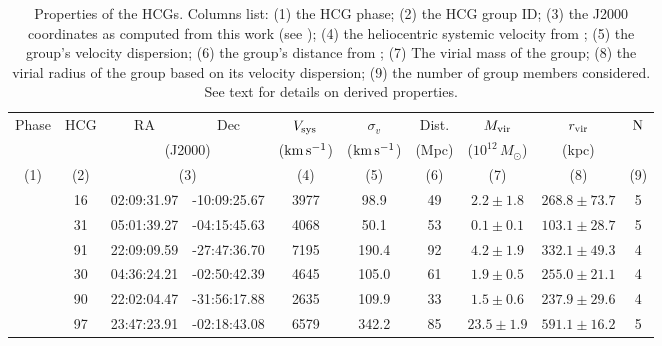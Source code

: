 \begin{table*}
    \centering
    \caption{Properties of the HCGs. Columns list: (1) the HCG phase; (2) the HCG group ID; (3) the J2000 coordinates as computed from this work (see ); (4) the heliocentric systemic velocity from \citet{Jones2023};     (5) the group's velocity dispersion; (6) the group's distance from \citet{Jones2023}; (7) The virial mass of the group; (8) the virial radius of the group based on its velocity dispersion; (9) the number of group members considered. See text for details on derived properties.}
    \label{tab:hcg_props}
    \begin{tabular}{c c c c c c c c c c}
    \hline \hline 
\multirow{2}{*}{Phase} & \multirow{2}{*}{HCG} & RA & Dec & $V_{\rm sys}$ & $\sigma_{v}$ & Dist. & $M_{\rm vir}$ & $r_{\rm vir}$ & \multirow{2}{*}{$\rm N$}\\ 
 & & \multicolumn{2}{c}{(J2000)} & ($\rm km\,s^{-1}$) & ($\rm km\,s^{-1}$) & (Mpc) & ($10^{12}\,M_\odot$) & (kpc) & \\ 
(1) & (2) & \multicolumn{2}{c}{(3)} & (4) & (5) & (6) & (7) & (8) & (9) \\ 
\hline \rule{0pt}{10pt} 
\multirow{3}{*}{2} & 16 & 02:09:31.97 & -10:09:25.67 & 3977 & 98.9 & 49 & $2.2\pm1.8$ & $268.8\pm73.7$ & 5\\ 
 & 31 & 05:01:39.27 & -04:15:45.63 & 4068 & 50.1 & 53 & $0.1\pm0.1$ & $103.1\pm28.7$ & 5\\ 
 & 91 & 22:09:09.59 & -27:47:36.70 & 7195 & 190.4 & 92 & $4.2\pm1.9$ & $332.1\pm49.3$ & 4\\ 
\hline \rule{0pt}{10pt} 
\multirow{3}{*}{3} & 30 & 04:36:24.21 & -02:50:42.39 & 4645 & 105.0 & 61 & $1.9\pm0.5$ & $255.0\pm21.1$ & 4\\ 
 & 90 & 22:02:04.47 & -31:56:17.88 & 2635 & 109.9 & 33 & $1.5\pm0.6$ & $237.9\pm29.6$ & 4\\ 
 & 97 & 23:47:23.91 & -02:18:43.08 & 6579 & 342.2 & 85 & $23.5\pm1.9$ & $591.1\pm16.2$ & 5\\ 
\hline
\end{tabular}
\end{table*}